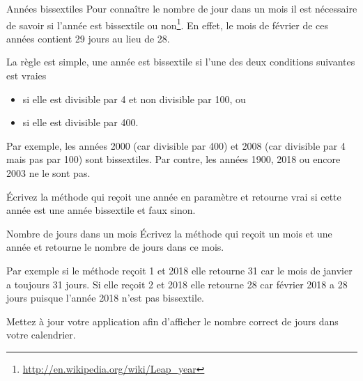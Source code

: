\documentclass[a4paper,11pt]{article}
\begin{document}
 	\begin{Exercice}{Années bissextiles}
	 Pour connaître le nombre de jour dans un mois il est nécessaire de savoir 
	 si l'année est bissextile ou non\footnote{\url{http://en.wikipedia.org/wiki/Leap_year}}. 
	 En effet, le mois de février de ces années contient 29 jours au lieu de 28. 
	 
	 La règle est simple, une année est bissextile si l'une des deux conditions suivantes est vraies
		\begin{itemize}
			\item si elle est divisible par 4 et non divisible par 100, ou
			\item si elle est divisible par 400.
		\end{itemize}
		
		Par exemple, les années 2000 (car divisible par 400) et 2008 (car divisible par 4 mais pas par 100)
		 sont bissextiles.
		 Par contre, les années 1900, 2018 ou encore 2003 ne le sont pas.

		\'Ecrivez la méthode  qui reçoit une année en paramètre et 
		retourne vrai si cette année est une année bissextile et faux sinon.

	\end{Exercice} 



 	\begin{Exercice}{Nombre de jours dans un mois}
		\'Ecrivez la méthode  qui reçoit un mois et une année et 
		retourne le nombre de jours dans ce mois.
		
		Par exemple si le méthode reçoit 1 et 2018 elle retourne 31 car le mois de janvier a toujours 31 jours.
		Si elle reçoit 2 et 2018 elle retourne 28 car février 2018 a 28 jours puisque l'année 2018 n'est pas bissextile.
		
		Mettez à jour votre application afin d'afficher le nombre correct de jours dans votre calendrier.
	\end{Exercice} 
\end{document}
